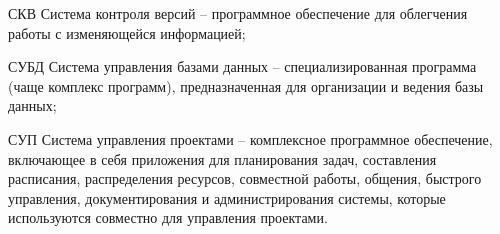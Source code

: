 \Abbreviations %
\begin{abbreviation}
\item[СКВ] Система контроля версий -- программное обеспечение для облегчения работы с изменяющейся информацией;
\item[СУБД] Система управления базами данных -- специализированная программа (чаще комплекс программ), предназначенная для организации и ведения базы данных;
\item[СУП] Система управления проектами -- комплексное программное обеспечение, включающее в себя приложения для планирования задач, составления расписания, распределения ресурсов, совместной работы, общения, быстрого управления, документирования и администрирования системы, которые используются совместно для управления проектами.

\end{abbreviation}


